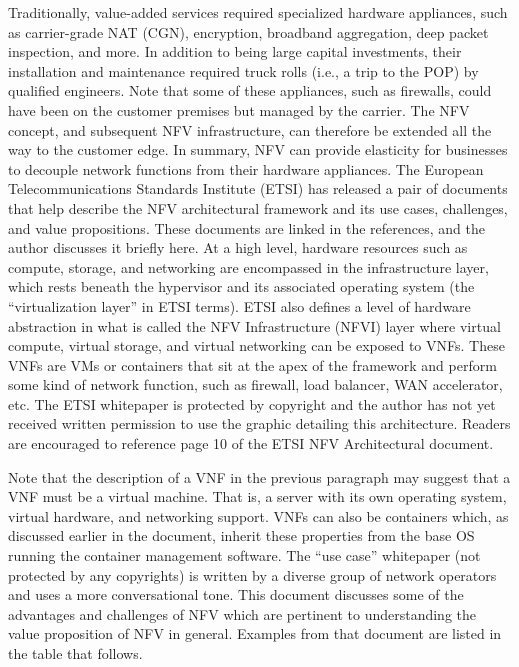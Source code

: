 Traditionally, value-added services required specialized hardware appliances,
such as carrier-grade NAT (CGN), encryption, broadband aggregation, deep
packet inspection, and more. In addition to being large capital investments,
their installation and maintenance required truck rolls (i.e., a trip to the
POP) by qualified engineers. Note that some of these appliances, such as
firewalls, could have been on the customer premises but managed by the
carrier. The NFV concept, and subsequent NFV infrastructure, can therefore be
extended all the way to the customer edge. In summary, NFV can provide
elasticity for businesses to decouple network functions from their hardware
appliances. The European Telecommunications Standards Institute (ETSI) has
released a pair of documents that help describe the NFV architectural
framework and its use cases, challenges, and value propositions. These
documents are linked in the references, and the author discusses it briefly
here. At a high level, hardware resources such as compute, storage, and
networking are encompassed in the infrastructure layer, which rests beneath
the hypervisor and its associated operating system (the ``virtualization layer''
in ETSI terms). ETSI also defines a level of hardware abstraction in what is
called the NFV Infrastructure (NFVI) layer where virtual compute, virtual
storage, and virtual networking can be exposed to VNFs. These VNFs are VMs or
containers that sit at the apex of the framework and perform some kind of
network function, such as firewall, load balancer, WAN accelerator, etc. The
ETSI whitepaper is protected by copyright and the author has not yet received
written permission to use the graphic detailing this architecture. Readers are
encouraged to reference page 10 of the ETSI NFV Architectural document.

Note that the description of a VNF in the previous paragraph may suggest that
a VNF must be a virtual machine. That is, a server with its own operating
system, virtual hardware, and networking support. VNFs can also be containers
which, as discussed earlier in the document, inherit these properties from the
base OS running the container management software. The ``use case'' whitepaper
(not protected by any copyrights) is written by a diverse group of network
operators and uses a more conversational tone. This document discusses some of
the advantages and challenges of NFV which are pertinent to understanding the
value proposition of NFV in general. Examples from that document are listed
in the table that follows.

